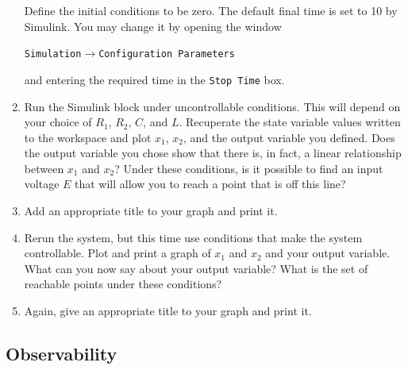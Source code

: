 \begin{enumerate}
          Define the initial conditions to be zero.  The default final time is set to
          10 by \textsf{Simulink}.  You may change it by opening the window
          \begin{center}
              \verb|Simulation|\(\rightarrow \)\verb|Configuration Parameters|
          \end{center}
          and entering the required time in the \verb|Stop Time| box.

    \item Run the \textsf{Simulink} block under uncontrollable conditions. This
          will depend on your choice of \(R_{1}\), \(R_{2}\), \(C\), and \(L\).
          Recuperate the state variable values written to the workspace and plot
          \(x_{1}\), \(x_{2}\), and the output variable you defined.  Does the output
          variable you chose show that there is, in fact, a linear relationship between
          \(x_{1}\) and \(x_{2}\)? Under these conditions, is it possible to find an input
          voltage \(E\) that will allow you to reach a point that is off this line?

    \item Add an appropriate title to your graph and print it.

    \item Rerun the system, but this time use conditions that make the system
          controllable.  Plot and print a graph of \(x_{1}\) and \(x_{2}\) and your output
          variable.  What can you now say about your output variable?  What is the set
          of reachable points under these conditions?

    \item Again, give an appropriate title to your graph and print it.
\end{enumerate}

\subsection{Observability}

